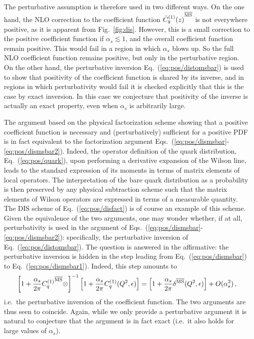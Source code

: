The perturbative  assumption is therefore used in two different
ways. On the one hand, the NLO correction to the \msbar{}  coefficient function
 ${\bar  C^{(1)}_q(z)}^{{\overline{\textrm{MS}}}}$ is not everywhere positive, as it is
apparent from Fig.~\ref{fig:dis}. However, this is a small correction
to the positive coefficient function if $\alpha_s\lesssim 1$, and the
overall coefficient function remain positive. This would fail in a
region in which $\alpha_s$ blows up. So the full NLO coefficient
function remains positive, but only in the perturbative region. On the other
hand, the perturbative inversion Eq.~(\ref{eq:pos/distomsbar}) is used to
show that positivity of the coefficient function is shared by its
inverse, and in regions in which perturbativity would fail it is
checked explicitly that this is the case by exact inversion. In this
case we conjecture that positivity of the inverse is actually an exact
property, even when $\alpha_s$ is arbitrarily large.

The argument based on the physical factorization scheme showing that
a positive coefficient function is necessary and (perturbatively)
sufficient for a positive PDF is in fact equivalent to the
factorization argument
Eqs.~(\ref{eq:pos/dismsbar}-\ref{eq:pos/dismsbar2}). Indeed, 
the operator definition of the quark distribution, Eq.~(\ref{eq:pos/quark}),
upon performing a derivative expansion of the Wilson line, leads to
the standard expression of its moments in terms of matrix elements of
local operators. The interpretation of the bare quark distribution as
a probability  is then
preserved by any physical subtraction scheme such that the matrix
elements of Wilson operators are expressed in terms of a measurable
quantity. The DIS scheme of Eq.~(\ref{eq:pos/disfact}) is of course an
example of this scheme. Given the equivalence of the two arguments,
one may wonder whether, if at all, perturbativity is used in the
argument of Eqs.~(\ref{eq:pos/dismsbar}-\ref{eq:pos/dismsbar2}): specifically,
the perturbative inversion of Eq.~(\ref{eq:pos/distomsbar}). The question is
answered in the affirmative: the perturbative inversion is hidden in the step leading from Eq.~(\ref{eq:pos/dismsbar})
to Eq.~(\ref{eq:pos/dismsbar1}). Indeed, this step amounts to 
\begin{equation}\label{eq:pos/exinv}
\left[1
  +\frac{\alpha_s}{2\pi} {C_{q}^{(1)}}^{{\overline{\textrm{MS}}}}\otimes\right]^{-1} \left[1
    +\frac{\alpha_s}{2\pi} C_{q}^{(1)}(Q^2,\epsilon)\right]=
\left[1
    +\frac{\alpha_s}{2\pi} \delta^{{\overline{\textrm{MS}}}} (Q^2,\epsilon)\right]
+O(\alpha_s^2) \,,
\end{equation}
i.e.\ the perturbative inversion of the \msbar{} coefficient function. 
The two arguments are thus seen
to coincide. Again, while we only provide a perturbative argument it
is natural to conjecture that the argument is in fact exact (i.e.\ it
also holds for large values of $\alpha_s$).
 


